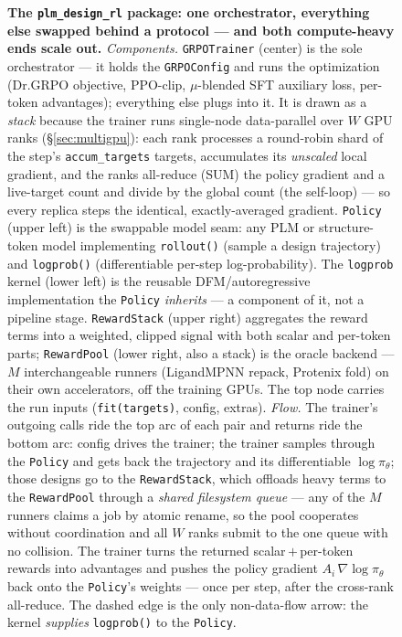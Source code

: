 \documentclass[11pt]{article}
\newcommand{\ttk}[1]{\texttt{\small #1}}
\begin{document}
\begin{figure}[htbp]
\caption{\textbf{The \ttk{plm\_design\_rl} package: one orchestrator, everything else swapped behind a
protocol --- and both compute-heavy ends scale out.} \emph{Components.} \ttk{GRPOTrainer} (center) is
the sole orchestrator --- it holds the \ttk{GRPOConfig} and runs the optimization (Dr.GRPO objective,
PPO-clip, $\mu$-blended SFT auxiliary loss, per-token advantages); everything else plugs into it. It
is drawn as a \emph{stack} because the trainer runs single-node data-parallel over $W$ GPU ranks
(\S\ref{sec:multigpu}): each rank processes a round-robin shard of the step's \ttk{accum\_targets}
targets, accumulates its \emph{unscaled} local gradient, and the ranks all-reduce (SUM) the policy
gradient and a live-target count and divide by the global count (the self-loop) --- so every replica
steps the identical, exactly-averaged gradient. \ttk{Policy} (upper left) is the swappable model seam:
any PLM or structure-token model implementing \ttk{rollout()} (sample a design trajectory) and
\ttk{logprob()} (differentiable per-step log-probability). The \ttk{logprob} kernel (lower left) is the
reusable DFM/autoregressive implementation the \ttk{Policy} \emph{inherits} --- a component of it, not
a pipeline stage. \ttk{RewardStack} (upper right) aggregates the reward terms into a weighted, clipped
signal with both scalar and per-token parts; \ttk{RewardPool} (lower right, also a stack) is the oracle
backend --- $M$ interchangeable runners (LigandMPNN repack, Protenix fold) on their own accelerators,
off the training GPUs. The top node carries the run inputs (\ttk{fit(targets)}, config, extras).
\emph{Flow.} The trainer's outgoing calls ride the top arc of each pair and returns ride the bottom
arc: config drives the trainer; the trainer samples through the \ttk{Policy} and gets back the
trajectory and its differentiable $\log\pi_\theta$; those designs go to the \ttk{RewardStack}, which
offloads heavy terms to the \ttk{RewardPool} through a \emph{shared filesystem queue} --- any of the
$M$ runners claims a job by atomic rename, so the pool cooperates without coordination and all $W$
ranks submit to the one queue with no collision. The trainer turns the returned scalar\,$+$\,per-token
rewards into advantages and pushes the policy gradient $A_i\,\nabla\log\pi_\theta$ back onto the
\ttk{Policy}'s weights --- once per step, after the cross-rank all-reduce. The dashed edge is the only
non-data-flow arrow: the kernel \emph{supplies} \ttk{logprob()} to the \ttk{Policy}.}
\label{fig:package}
\end{figure}
\end{document}
